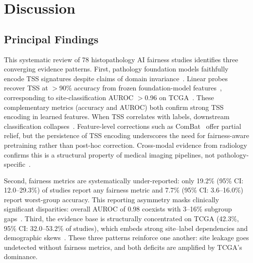 
\section{Discussion}
\label{sec:discussion}

\subsection{Principal Findings}
\label{sec:discussion:findings}

This systematic review of 78 histopathology AI fairness studies identifies three converging evidence patterns. First, pathology foundation models faithfully encode TSS signatures despite claims of domain invariance~\citep{vorontsov2024foundation, campanella2025clinical}. Linear probes recover TSS at $>$90\% accuracy from frozen foundation-model features~\citep{komen2024batch}, corresponding to site-classification AUROC $>$0.96 on TCGA~\citep{howard2021site}. These complementary metrics (accuracy and AUROC) both confirm strong TSS encoding in learned features. When TSS correlates with labels, downstream classification collapses~\citep{howard2021site, dehkharghanian2023biased}. Feature-level corrections such as ComBat~\citep{murchan2024combat} offer partial relief, but the persistence of TSS encoding underscores the need for fairness-aware pretraining rather than post-hoc correction. Cross-modal evidence from radiology confirms this is a structural property of medical imaging pipelines, not pathology-specific~\citep{gao2022race, yang2025demographic}.

Second, fairness metrics are systematically under-reported: only 19.2\% (95\% CI: 12.0--29.3\%) of studies report any fairness metric and 7.7\% (95\% CI: 3.6--16.0\%) report worst-group accuracy. This reporting asymmetry masks clinically significant disparities: overall AUROC of 0.98 coexists with 3--16\% subgroup gaps~\citep{vaidya2024demographic}. Third, the evidence base is structurally concentrated on TCGA (42.3\%, 95\% CI: 32.0--53.2\% of studies), which embeds strong site--label dependencies and demographic skews~\citep{howard2021site, wang2018tcga}. These three patterns reinforce one another: site leakage goes undetected without fairness metrics, and both deficits are amplified by TCGA's dominance.

